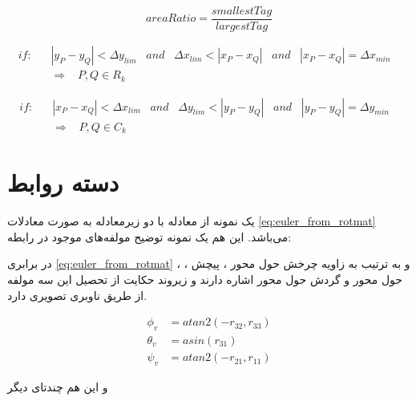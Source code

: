 \begin{equation}
areaRatio = \frac{smallestTag}{largestTag}
\label{eqn:areaRatio}
\end{equation}

\begin{equation}
\label{eq:co-row standard}
\begin{aligned}
if:  \;\;\; &|y_P-y_Q|<\Delta y_{lim} \;\;\; and  \;\;\; \Delta x_{lim}<|x_P-x_Q|  \;\;\; and  \;\;\; |x_P-x_Q|=\Delta x_{min} \;\;\; \\ &\Rightarrow   \;\;\; P,Q\in R_k 
\end{aligned}
\end{equation}

\begin{equation}
\label{eq:co-column standard}
\begin{aligned}
if:  \;\;\; &|x_P-x_Q|<\Delta x_{lim} \;\;\; and  \;\;\; \Delta y_{lim}<|y_P-y_Q|  \;\;\; and  \;\;\; |y_P-y_Q|=\Delta y_{min} \;\;\; \\ &\Rightarrow   \;\;\; P,Q\in C_k 
\end{aligned}
\end{equation}

\section{ 
دسته روابط
}
\label{sec:Introduction} 


یک نمونه از معادله با دو زیرمعادله به صورت معادلات
\ref{eq:euler_from_rotmat}
می‌باشد. این هم یک نمونه توضیح مولفه‌های موجود در رابطه:

در برابری
\ref{eq:euler_from_rotmat}
،
،
و
به ترتیب به زاویه چرخش حول محور
، پیچش حول محور
و گردش حول محور
اشاره دارند و زیروند
حکایت از تحصیل این سه مولفه از طریق ناوبری تصویری دارد.

\begin{subequations}
\label{eq:euler_from_rotmat}
\begin{align}
\phi_{v} &= atan2(-r_{32}, r_{33}) \\
\theta_{v} &= asin(r_{31}) \\
\psi_{v} &= atan2(-r_{21}, r_{11})
\end{align}
\end{subequations}
 
 و این هم چندتای دیگر
 
